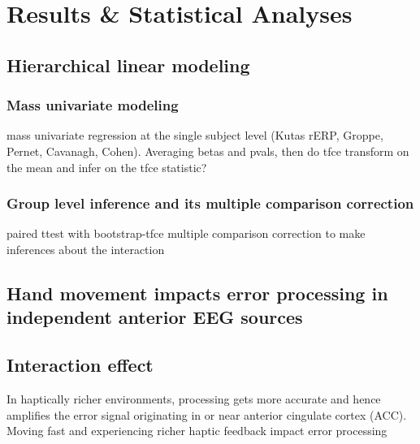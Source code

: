 \section{Results \& Statistical Analyses}

\subsection{Hierarchical linear modeling}
\subsubsection{Mass univariate modeling}
mass univariate regression at the single subject level (Kutas rERP, Groppe, Pernet, Cavanagh, Cohen). Averaging betas and pvals, then do tfce transform on the mean and infer on the tfce statistic? 
\subsubsection{Group level inference and its multiple comparison correction}
paired ttest with bootstrap-tfce multiple comparison correction \citep{SMITH200983} to make inferences about the interaction

\subsection{Hand movement impacts error processing in independent anterior EEG sources}

\subsection{Interaction effect}
In haptically richer environments, processing gets more accurate and hence amplifies the error signal originating in or near anterior cingulate cortex (ACC). Moving fast and experiencing richer haptic feedback impact error processing